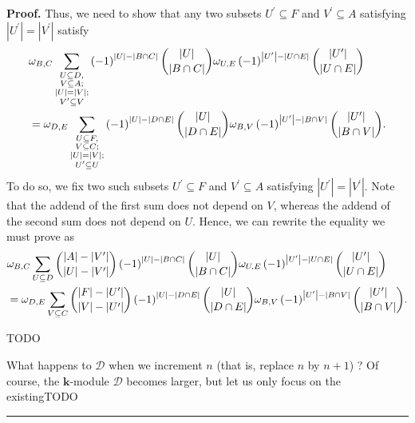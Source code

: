 \documentclass[numbers=enddot,12pt,final,onecolumn,notitlepage]{scrartcl}%
\providecommand{\U}[1]{\protect\rule{.1in}{.1in}}
\numberwithin{exer}{subsection}
\theoremstyle{definition}
\newenvironment{proof}[1][Proof]{\noindent\textbf{#1.} }{\ \rule{0.5em}{0.5em}}
\let\sumnonlimits\sum
\renewcommand{\sum}{\sumnonlimits\limits}
\newenvironment{noncompile}{}{}
\begin{document}
\begin{noncompile}
\begin{proof}
Thus, we need to show that any two subsets $U^{\prime}\subseteq F$ and
$V^{\prime}\subseteq A$ satisfying $\left\vert U^{\prime}\right\vert
=\left\vert V^{\prime}\right\vert $ satisfy%
\begin{align*}
&  \omega_{B,C}\sum_{\substack{U\subseteq D,\\V\subseteq A;\\\left\vert
U\right\vert =\left\vert V\right\vert ;\\V^{\prime}\subseteq V}}\left(
-1\right)  ^{\left\vert U\right\vert -\left\vert B\cap C\right\vert }%
\dbinom{\left\vert U\right\vert }{\left\vert B\cap C\right\vert }\omega
_{U,E}\left(  -1\right)  ^{\left\vert U^{\prime}\right\vert -\left\vert U\cap
E\right\vert }\dbinom{\left\vert U^{\prime}\right\vert }{\left\vert U\cap
E\right\vert }\\
&  =\omega_{D,E}\sum_{\substack{U\subseteq F,\\V\subseteq C;\\\left\vert
U\right\vert =\left\vert V\right\vert ;\\U^{\prime}\subseteq U}}\left(
-1\right)  ^{\left\vert U\right\vert -\left\vert D\cap E\right\vert }%
\dbinom{\left\vert U\right\vert }{\left\vert D\cap E\right\vert }\omega
_{B,V}\left(  -1\right)  ^{\left\vert U^{\prime}\right\vert -\left\vert B\cap
V\right\vert }\dbinom{\left\vert U^{\prime}\right\vert }{\left\vert B\cap
V\right\vert }.
\end{align*}
To do so, we fix two such subsets $U^{\prime}\subseteq F$ and $V^{\prime
}\subseteq A$ satisfying $\left\vert U^{\prime}\right\vert =\left\vert
V^{\prime}\right\vert $. Note that the addend of the first sum does not depend
on $V$, whereas the addend of the second sum does not depend on $U$. Hence, we
can rewrite the equality we must prove as%
\begin{align*}
&  \omega_{B,C}\sum_{U\subseteq D}\dbinom{\left\vert A\right\vert -\left\vert
V^{\prime}\right\vert }{\left\vert U\right\vert -\left\vert V^{\prime
}\right\vert }\left(  -1\right)  ^{\left\vert U\right\vert -\left\vert B\cap
C\right\vert }\dbinom{\left\vert U\right\vert }{\left\vert B\cap C\right\vert
}\omega_{U,E}\left(  -1\right)  ^{\left\vert U^{\prime}\right\vert -\left\vert
U\cap E\right\vert }\dbinom{\left\vert U^{\prime}\right\vert }{\left\vert
U\cap E\right\vert }\\
&  =\omega_{D,E}\sum_{V\subseteq C}\dbinom{\left\vert F\right\vert -\left\vert
U^{\prime}\right\vert }{\left\vert V\right\vert -\left\vert U^{\prime
}\right\vert }\left(  -1\right)  ^{\left\vert U\right\vert -\left\vert D\cap
E\right\vert }\dbinom{\left\vert U\right\vert }{\left\vert D\cap E\right\vert
}\omega_{B,V}\left(  -1\right)  ^{\left\vert U^{\prime}\right\vert -\left\vert
B\cap V\right\vert }\dbinom{\left\vert U^{\prime}\right\vert }{\left\vert
B\cap V\right\vert }.
\end{align*}


TODO

What happens to $\mathcal{D}$ when we increment $n$ (that is, replace $n$ by
$n+1$) ? Of course, the $\mathbf{k}$-module $\mathcal{D}$ becomes larger, but
let us only focus on the existingTODO
\end{proof}
\end{noncompile}
\end{document}
